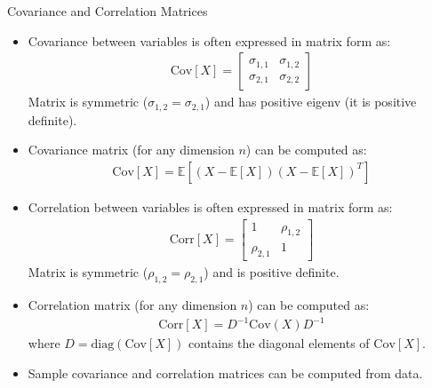 \documentclass[9pt]{beamer}
\begin{document}
%
\begin{frame}{Covariance and Correlation Matrices}

\begin{itemize}
\item Covariance between variables is often expressed in matrix form as: 
\begin{align*}
\textrm{Cov}[X]=\left[\begin{array}{cc}\sigma_{1,1}&\sigma_{1,2}\\ \sigma_{2,1}&\sigma_{2,2}\end{array}\right]
\end{align*}
Matrix is symmetric ($\sigma_{1,2}=\sigma_{2,1}$) and has positive eigenv (it is positive definite).  

\item Covariance matrix (for any dimension $n$) can be computed as:
\begin{align*}
\textrm{Cov}[X]=\mathbb{E}\left[(X-\mathbb{E}[X])(X-\mathbb{E}[X])^T\right]
\end{align*}

\item Correlation between variables is often expressed in matrix form as: 
\begin{align*}
\textrm{Corr}[X]=\left[\begin{array}{cc}1&\rho_{1,2}\\ \rho_{2,1}&1\end{array}\right]
\end{align*}
Matrix is symmetric ($\rho_{1,2}=\rho_{2,1}$) and is positive definite.  

\item Correlation matrix (for any dimension $n$) can be computed as:
\begin{align*}
\textrm{Corr}[X]=D^{-1}\textrm{Cov}(X) D^{-1}
\end{align*}
where $D=\textrm{diag}(\textrm{Cov}[X])$ contains the diagonal elements of $\textrm{Cov}[X]$. 
\item Sample covariance and correlation matrices can be computed from data. 
\end{itemize}


\end{frame}
\end{document}
